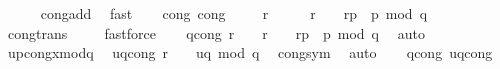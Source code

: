 \begin{isabellebody}
\ \ \ \ \isamarkupfalse%
\ cong{\isacharunderscore}{\kern0pt}add\ \isamarkupfalse%
\ fast\isanewline
\ \ \isamarkupfalse%
\ cong{\isacharunderscore}{\kern0pt}{}\ cong{\isacharunderscore}{\kern0pt}{}\ \isanewline
\ \ \isamarkupfalse%
\ {\isachardoublequoteopen}{\isacharbrackleft}{\kern0pt}{\isacharparenleft}{\kern0pt}r\ {\isacharcircum}{\kern0pt}\ {}{\isacharparenright}{\kern0pt}\ {\isacharequal}{\kern0pt}\ {}\ {\isacharplus}{\kern0pt}\ {\isacharparenleft}{\kern0pt}r\ {\isacharcircum}{\kern0pt}\ {}{\isacharparenright}{\kern0pt}\ {\isacharasterisk}{\kern0pt}\ r{\isacharunderscore}{\kern0pt}p\ {\isacharasterisk}{\kern0pt}\ p{\isacharbrackright}{\kern0pt}\ {\isacharparenleft}{\kern0pt}mod\ q{\isacharparenright}{\kern0pt}{\isachardoublequoteclose}\ \isanewline
\ \ \ \ \isamarkupfalse%
\ cong{\isacharunderscore}{\kern0pt}trans\isanewline
\ \ \ \isamarkupfalse%
\ fastforce\isanewline
\ \ \isamarkupfalse%
\ q{\isacharunderscore}{\kern0pt}cong{\isacharcolon}{\kern0pt}\ {\isachardoublequoteopen}{\isacharbrackleft}{\kern0pt}{\isacharparenleft}{\kern0pt}r\ {\isacharcircum}{\kern0pt}\ {}{\isacharparenright}{\kern0pt}\ {\isacharequal}{\kern0pt}\ {\isacharparenleft}{\kern0pt}r\ {\isacharcircum}{\kern0pt}\ {}{\isacharparenright}{\kern0pt}\ {\isacharasterisk}{\kern0pt}\ r{\isacharunderscore}{\kern0pt}p\ {\isacharasterisk}{\kern0pt}\ p{\isacharbrackright}{\kern0pt}\ {\isacharparenleft}{\kern0pt}mod\ q{\isacharparenright}{\kern0pt}{\isachardoublequoteclose}\ \isamarkupfalse%
\ auto\isanewline
\ \ \isanewline
\ \ \isamarkupfalse%
\ up{\isacharunderscore}{\kern0pt}cong{\isacharunderscore}{\kern0pt}x{\isacharunderscore}{\kern0pt}mod{\isacharunderscore}{\kern0pt}q\ \isamarkupfalse%
\ uq{\isacharunderscore}{\kern0pt}cong{\isacharcolon}{\kern0pt}\ {\isachardoublequoteopen}{\isacharbrackleft}{\kern0pt}{\isacharparenleft}{\kern0pt}r\ {\isacharcircum}{\kern0pt}\ {}{\isacharparenright}{\kern0pt}\ {\isacharequal}{\kern0pt}\ {\isacharquery}{\kern0pt}uq{\isacharbrackright}{\kern0pt}\ {\isacharparenleft}{\kern0pt}mod\ q{\isacharparenright}{\kern0pt}{\isachardoublequoteclose}\ \isamarkupfalse%
\ cong{\isacharunderscore}{\kern0pt}sym\ \isamarkupfalse%
\ auto\isanewline
\ \ \isamarkupfalse%
\ q{\isacharunderscore}{\kern0pt}cong\ uq{\isacharunderscore}{\kern0pt}cong\ \isanewline
\ \ \isamarkupfalse%

\end{isabellebody}
